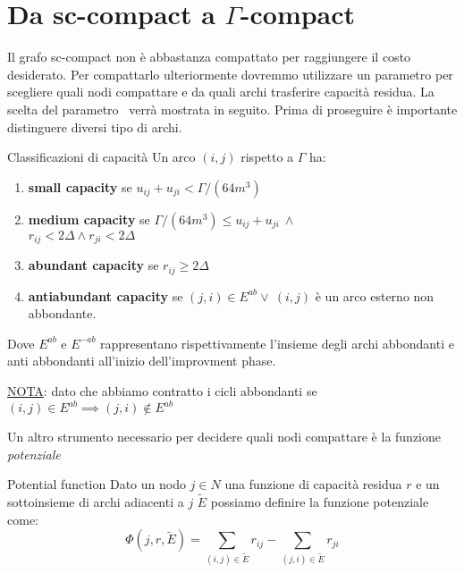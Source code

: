 \section{Da sc-compact a $\Gamma$-compact}
Il grafo sc-compact non è abbastanza compattato per raggiungere il costo desiderato. Per compattarlo ulteriormente dovremmo utilizzare un parametro \gmm per scegliere quali nodi compattare e da quali archi trasferire capacità residua.
La scelta del parametro \gmm\ verrà mostrata in seguito.
Prima di proseguire è importante distinguere diversi tipo di archi.
\begin{definition}{Classificazioni di capacità}{}
    Un arco $(i,j)$ rispetto a $\Gamma$ ha:
    \begin{enumerate}
        \item \textbf{small capacity} se $u_{ij}+u_{ji} < \Gamma/(64m^3)$
        \item \label{media}\textbf{medium capacity} se $\Gamma/(64m^3) \le u_{ij}+u_{ji}\ \land$\\ $r_{ij} < 2\Delta \land r_{ji} < 2\Delta $
        \item \textbf{abundant capacity} se $r_{ij} \ge 2\Delta$ 
        \item \textbf{antiabundant capacity} se $(j,i) \in E^{ab} \lor\ (i,j)$ è un arco esterno non abbondante.
    \end{enumerate}
    Dove $E^{ab}$ e $E^{-ab}$ rappresentano rispettivamente l'insieme degli archi abbondanti e anti abbondanti all'inizio dell'improvment phase.

    \underline{NOTA}: dato che abbiamo contratto i cicli abbondanti se $(i,j)\in E^{ab}\implies (j,i)\not \in E^{ab}$
    
\end{definition}

Un altro strumento necessario per decidere quali nodi compattare è la funzione \textit{potenziale}
\begin{definition}{Potential function}{}
    Dato un nodo $j\in N$ una funzione di capacità residua $r$ e un sottoinsieme di archi adiacenti a $j$ $\tilde{E}$  possiamo definire la funzione potenziale come: 
    \[\Phi (j, r, \tilde{E}) = \sum_{(i,j)\in \tilde{E}} r_{ij}-\sum_{(j,i)\in \tilde{E}} r_{ji}\] 
\end{definition}

